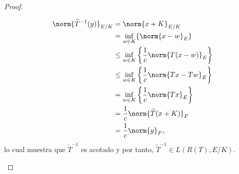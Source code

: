 \begin{proof}
\begin{enumerate}
\begin{enumerate}
      \begin{align*}
          \norm{\widetilde{T}^{-1}(y)}_{E/K}&=\norm{x+K}_{E/K} \\&=\inf_{w\in K}\{\norm{x-w}_E\} \\&\leq \inf_{w\in K}\left\{\frac{1}{c}\norm{T(x-w)}_E\right\}\\&\leq \inf_{w\in K}\left\{\frac{1}{c}\norm{Tx-Tw}_E\right\}\\&= \inf_{w\in K}\left\{\frac{1}{c}\norm{Tx}_E\right\}\\&=\frac{1}{c}\norm{\widetilde{T}(x+K)}_F \\&=\frac{1}{c}\norm{y}_F,
      \end{align*}
      lo cual muestra que $\widetilde{T}^{-1}$ es acotado y por tanto, $\widetilde{T}^{-1} \in L(R(T),E/K)$.
    \end{enumerate}
\end{enumerate}
\end{proof}

